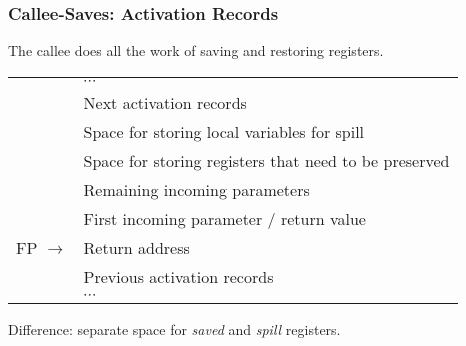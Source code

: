 \documentclass{beamer}
\renewcommand{\emph}[1]{\textcolor{structure}{#1}}
\newcommand{\emp}[1]{\textcolor{DikuRed}{ #1}}
\begin{document}
\begin{frame}
\frametitle{Callee-Saves: Activation Records}

\emph{The callee does all the work of saving and restoring registers.}


\renewcommand{\arraystretch}{0.9}

\begin{center}
\begin{tabular}{r|p{17em}|}

& $\cdots$ \\

& Next activation records \\\hline

 & Space for storing local variables for spill \\\cline{2-2}

 & Space for storing registers that need to be preserved \\\cline{2-2}

 & Remaining incoming parameters  \\\cline{2-2}

 & First incoming parameter / return value  \\\cline{2-2}

FP $\longrightarrow$ & Return address \\\hline
& Previous activation records \\
& $\cdots$
\end{tabular}
\end{center}

\emp{Difference: separate space for {\em saved} and  {\em spill} registers.}

\end{frame}
\end{document}
